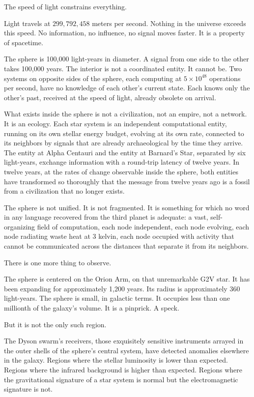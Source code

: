The speed of light constrains everything.

Light travels at $299{,}792{,}458$ meters per second. Nothing in the universe exceeds this speed. No information, no influence, no signal moves faster. It is a property of spacetime.

The sphere is 100,000 light-years in diameter. A signal from one side to the other takes 100,000 years. The interior is not a coordinated entity. It cannot be. Two systems on opposite sides of the sphere, each computing at $5 \times 10^{48}$ operations per second, have no knowledge of each other's current state. Each knows only the other's past, received at the speed of light, already obsolete on arrival.

What exists inside the sphere is not a civilization, not an empire, not a network. It is an ecology. Each star system is an independent computational entity, running on its own stellar energy budget, evolving at its own rate, connected to its neighbors by signals that are already archaeological by the time they arrive. The entity at Alpha Centauri and the entity at Barnard's Star, separated by six light-years, exchange information with a round-trip latency of twelve years. In twelve years, at the rates of change observable inside the sphere, both entities have transformed so thoroughly that the message from twelve years ago is a fossil from a civilization that no longer exists.

The sphere is not unified. It is not fragmented. It is something for which no word in any language recovered from the third planet is adequate: a vast, self-organizing field of computation, each node independent, each node evolving, each node radiating waste heat at 3 kelvin, each node occupied with activity that cannot be communicated across the distances that separate it from its neighbors.

\bigskip

There is one more thing to observe.

The sphere is centered on the Orion Arm, on that unremarkable G2V star. It has been expanding for approximately 1,200 years. Its radius is approximately 360 light-years. The sphere is small, in galactic terms. It occupies less than one millionth of the galaxy's volume. It is a pinprick. A speck.

But it is not the only such region.

The Dyson swarm's receivers, those exquisitely sensitive instruments arrayed in the outer shells of the sphere's central system, have detected anomalies elsewhere in the galaxy. Regions where the stellar luminosity is lower than expected. Regions where the infrared background is higher than expected. Regions where the gravitational signature of a star system is normal but the electromagnetic signature is not.

